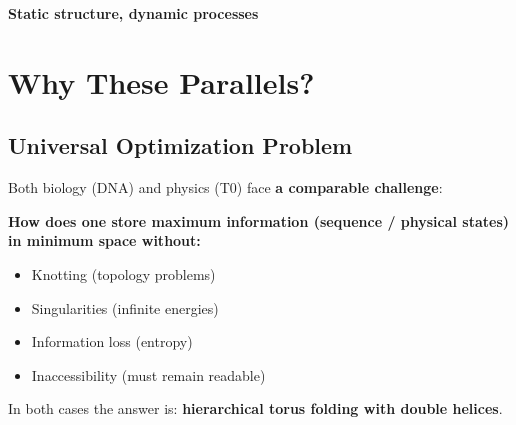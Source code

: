 	\begin{keyresult}
		\textbf{Static structure, dynamic processes}

		\vspace{0.3cm}

		\begin{center}
		\end{center}
	\end{keyresult}

	\section{Why These Parallels?}

	\subsection{Universal Optimization Problem}

	\begin{philosophical}
		Both biology (DNA) and physics (T0) face \textbf{a comparable challenge}:

		\vspace{0.3cm}

		\textbf{How does one store maximum information (sequence / physical states) in minimum space without:}
		\begin{itemize}
			\item Knotting (topology problems)
			\item Singularities (infinite energies)
			\item Information loss (entropy)
			\item Inaccessibility (must remain readable)
		\end{itemize}

		\vspace{0.3cm}

		In both cases the answer is: \textbf{hierarchical torus folding with double helices}.
	\end{philosophical}

